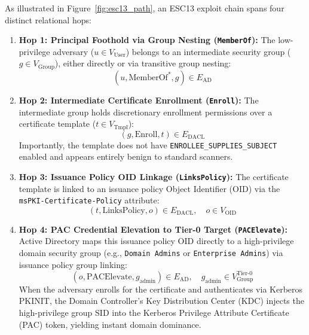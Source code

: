 As illustrated in Figure~\ref{fig:esc13_path}, an ESC13 exploit chain spans four distinct relational hops:
\begin{enumerate}
    \item \textbf{Hop 1: Principal Foothold via Group Nesting (\texttt{MemberOf}):} The low-privilege adversary ($u \in V_{\text{User}}$) belongs to an intermediate security group ($g \in V_{\text{Group}}$), either directly or via transitive group nesting:
    \begin{equation}
    (u, \text{MemberOf}^*, g) \in E_{\text{AD}}
    \end{equation}
    \item \textbf{Hop 2: Intermediate Certificate Enrollment (\texttt{Enroll}):} The intermediate group holds discretionary enrollment permissions over a certificate template ($t \in V_{\text{Tmpl}}$):
    \begin{equation}
    (g, \text{Enroll}, t) \in E_{\text{DACL}}
    \end{equation}
    Importantly, the template does not have \texttt{ENROLLEE\_SUPPLIES\_SUBJECT} enabled and appears entirely benign to standard scanners.
    \item \textbf{Hop 3: Issuance Policy OID Linkage (\texttt{LinksPolicy}):} The certificate template is linked to an issuance policy Object Identifier (OID) via the \texttt{msPKI-Certificate-Policy} attribute:
    \begin{equation}
    (t, \text{LinksPolicy}, o) \in E_{\text{DACL}}, \quad o \in V_{\text{OID}}
    \end{equation}
    \item \textbf{Hop 4: PAC Credential Elevation to Tier-0 Target (\texttt{PACElevate}):} Active Directory maps this issuance policy OID directly to a high-privilege domain security group (e.g., \texttt{Domain Admins} or \texttt{Enterprise Admins}) via issuance policy group linking:
    \begin{equation}
    (o, \text{PACElevate}, g_{\text{admin}}) \in E_{\text{AD}}, \quad g_{\text{admin}} \in V_{\text{Group}}^{\text{Tier-0}}
    \end{equation}
    When the adversary enrolls for the certificate and authenticates via Kerberos PKINIT, the Domain Controller's Key Distribution Center (KDC) injects the high-privilege group SID into the Kerberos Privilege Attribute Certificate (PAC) token, yielding instant domain dominance.
\end{enumerate}

